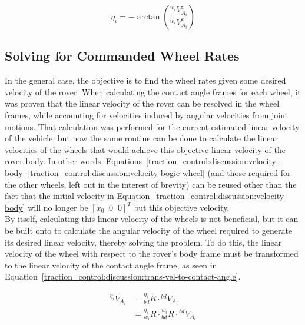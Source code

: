 \begin{equation}\label{traction_control:discussion:contact-angle-i}
	\eta_{i} = -\arctan\left(\frac{{}^{w_{i}}V^{z}_{A_{i}}}{{}^{w_{i}}V^{x}_{A_{i}}}\right)
\end{equation}

\subsection{Solving for Commanded Wheel Rates}\label{traction_control:discussion:solving-wheel-rates}
In the general case, the objective is to find the wheel rates given some desired velocity of the rover. When calculating the contact angle frames for each wheel, it was proven that the linear velocity of the rover can be resolved in the wheel frames, while accounting for velocities induced by angular velocities from joint motions. That calculation was performed for the current estimated linear velocity of the vehicle, but now the same routine can be done to calculate the linear velocities of the wheels that would achieve this objective linear velocity of the rover body. In other words, Equations~\ref{traction_control:discussion:velocity-body}-\ref{traction_control:discussion:velocity-bogie-wheel} (and those required for the other wheels, left out in the interest of brevity) can be reused other than the fact that the initial velocity in Equation~\ref{traction_control:discussion:velocity-body} will no longer be $\left[\dot{x}_0 \;\; 0 \;\; 0\right]^{T}$ but this objective velocity. \\

By itself, calculating this linear velocity of the wheels is not beneficial, but it can be built onto to calculate the angular velocity of the wheel required to generate its desired linear velocity, thereby solving the problem. To do this, the linear velocity of the wheel with respect to the rover's body frame must be transformed to the linear velocity of the contact angle frame, as seen in Equation~\ref{traction_control:discussion:trans-vel-to-contact-angle}.

\begin{equation}\label{traction_control:discussion:trans-vel-to-contact-angle}
	\begin{split}
		{}^{\eta_{i}}V_{A_{i}} & = {}^{\eta_{i}}_{bd}R \cdot {}^{bd}V_{A_{i}} \\
		& = {}^{\eta_{i}}_{w_{i}}R \cdot {}^{w_{i}}_{bd}R \cdot {}^{bd}V_{A_{i}}
	\end{split}
\end{equation}

